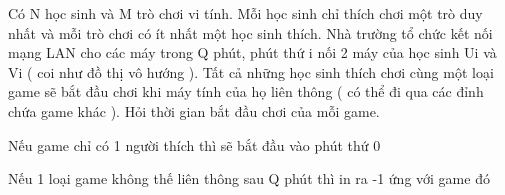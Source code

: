 Có N học sinh và M trò chơi vi tính. Mỗi học sinh chỉ thích chơi một trò duy nhất và mỗi trò chơi có ít nhất một học sinh thích. Nhà trường tổ chức kết nối mạng LAN cho các máy trong Q phút, phút thứ i nối 2 máy của học sinh Ui và Vi ( coi như đồ thị vô hướng ). Tất cả những học sinh thích chơi cùng một loại game sẽ bắt đầu chơi khi máy tính của họ liên thông ( có thể đi qua các đỉnh chứa game khác ). Hỏi thời gian bắt đầu chơi của mỗi game.

Nếu game chỉ có 1 người thích thì sẽ bắt đầu vào phút thứ 0

Nếu 1 loại game không thế liên thông sau Q phút thì in ra -1 ứng với game đó